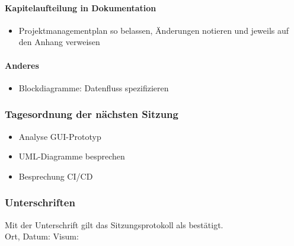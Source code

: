 \paragraph{Kapitelaufteilung in Dokumentation}
\begin{itemize}
	\item Projektmanagementplan so belassen, Änderungen notieren und jeweils auf den Anhang verweisen
\end{itemize}
\paragraph{Anderes}
\begin{itemize}
	\item Blockdiagramme: Datenfluss spezifizieren
\end{itemize}
\subsubsection{Tagesordnung der nächsten Sitzung}
\begin{itemize}
	\item Analyse GUI-Prototyp
	\item UML-Diagramme besprechen
	\item Besprechung CI/CD
\end{itemize}

\subsubsection{Unterschriften}

Mit der Unterschrift gilt das Sitzungsprotokoll als bestätigt.\\

Ort, Datum:	\underline{\hspace*{6cm}}	\hspace*{1cm} Visum:	\underline{\hspace*{4cm}}
\newpage


